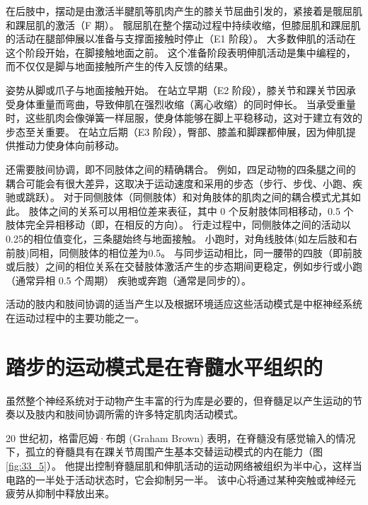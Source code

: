 在后肢中，摆动是由激活半腱肌等肌肉产生的膝关节屈曲引发的，紧接着是髋屈肌和踝屈肌的激活（F 期）。 髋屈肌在整个摆动过程中持续收缩，但膝屈肌和踝屈肌的活动在腿部伸展以准备与支撑面接触时停止（E1 阶段）。 大多数伸肌的活动在这个阶段开始，在脚接触地面之前。 这个准备阶段表明伸肌活动是集中编程的，而不仅仅是脚与地面接触所产生的传入反馈的结果。

姿势从脚或爪子与地面接触开始。 在站立早期（E2 阶段），膝关节和踝关节因承受身体重量而弯曲，导致伸肌在强烈收缩（离心收缩）的同时伸长。 当承受重量时，这些肌肉会像弹簧一样屈服，使身体能够在脚上平稳移动，这对于建立有效的步态至关重要。 在站立后期（E3 阶段），臀部、膝盖和脚踝都伸展，因为伸肌提供推动力使身体向前移动。

还需要肢间协调，即不同肢体之间的精确耦合。 例如，四足动物的四条腿之间的耦合可能会有很大差异，这取决于运动速度和采用的步态（步行、步伐、小跑、疾驰或跳跃）。 对于同侧肢体（同侧肢体）和对角肢体的肌肉之间的耦合模式尤其如此。 肢体之间的关系可以用相位差来表征，其中 0 个反射肢体同相移动，0.5 个肢体完全异相移动（即，在相反的方向）。 行走过程中，同侧肢体之间的活动以0.25的相位值变化，三条腿始终与地面接触。 小跑时，对角线肢体(如左后肢和右前肢)同相，同侧肢体的相位差为0.5。 与同步运动相比，同一腰带的四肢（即前肢或后肢）之间的相位关系在交替肢体激活产生的步态期间更稳定，例如步行或小跑（通常异相 0.5 个周期） 疾驰或奔跑（通常是同步的）。

活动的肢内和肢间协调的适当产生以及根据环境适应这些活动模式是中枢神经系统在运动过程中的主要功能之一。


\section{踏步的运动模式是在脊髓水平组织的}
虽然整个神经系统对于动物产生丰富的行为库是必要的，但脊髓足以产生运动的节奏以及肢内和肢间协调所需的许多特定肌肉活动模式。

20 世纪初，格雷厄姆·布朗 (Graham Brown) 表明，在脊髓没有感觉输入的情况下，孤立的脊髓具有在踝关节周围产生基本交替运动模式的内在能力（图 \ref{fig:33_5}）。
他提出控制脊髓屈肌和伸肌活动的运动网络被组织为半中心，这样当电路的一半处于活动状态时，它会抑制另一半。 该中心将通过某种突触或神经元疲劳从抑制中释放出来。

